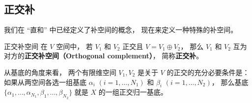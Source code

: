 \subsection{正交补}
我们在 “直和” 中已经定义了补空间的概念， 现在来定义一种特殊的补空间。
\begin{definition}{正交补空间}\label{def_OrthSp_1}
在 $V$ 空间中， 若 $V_1$ 和 $V_2$ 正交且 $V = V_1 \oplus V_2$， 那么 $V_1$ 和 $V_2$ 互为对方的\textbf{正交补空间（Orthogonal complement）}， 简称\textbf{正交补}。
\end{definition}

\begin{theorem}{}\label{the_OrthSp_1}
从基底的角度来看， 两个有限维空间 $V_1, V_2$ 是关于 $V$ 的正交的充分必要条件是： 如果从两空间各选一组基底 ${\alpha_i}$ $(i = 1, \dots, N_1)$ 和 ${\beta_i}$ $(i = 1, \dots, N_2)$， 那么基底 $\{\alpha_1, \dots, \alpha_{N_1}, \beta_1, \dots, \beta_{N_2}\}$ 就是 $X$ 的一组正交归一基底。
\end{theorem}


